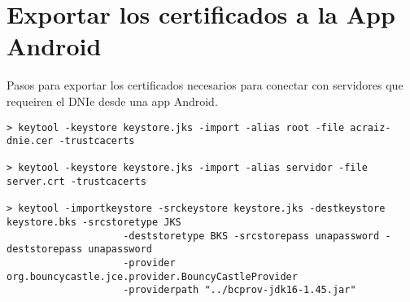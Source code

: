 \section{Exportar los certificados a la App Android} \label{App:exportarCertsAppAndroid}

Pasos para exportar los certificados necesarios para conectar con servidores que requeiren el DNIe desde una app Android.

\begin{verbatim}
> keytool -keystore keystore.jks -import -alias root -file acraiz-dnie.cer -trustcacerts

> keytool -keystore keystore.jks -import -alias servidor -file server.crt -trustcacerts

> keytool -importkeystore -srckeystore keystore.jks -destkeystore keystore.bks -srcstoretype JKS 
					-deststoretype BKS -srcstorepass unapassword -deststorepass unapassword 
					-provider org.bouncycastle.jce.provider.BouncyCastleProvider 
					-providerpath "../bcprov-jdk16-1.45.jar"
\end{verbatim}